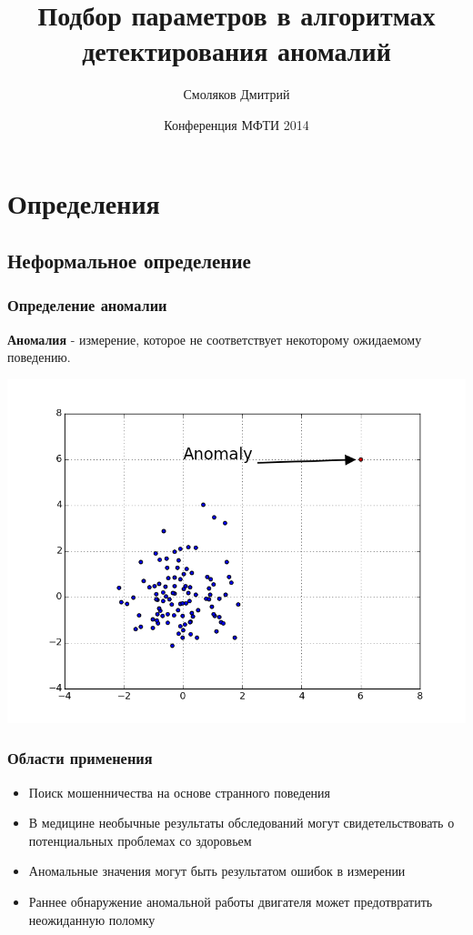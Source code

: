 \documentclass[10pt,pdf]{beamer}
\title{Подбор параметров в алгоритмах детектирования аномалий}
\author{Смоляков Дмитрий}
\institute{ИППИ РАН}
\date{Конференция МФТИ 2014}
\begin{document}
\maketitle
\section{Определения}
\subsection{Неформальное определение}
\begin{frame}\frametitle{Определение аномалии}
\textbf{Аномалия} - измерение, которое не соответствует некоторому ожидаемому поведению.
\begin{center}
\includegraphics[scale=0.45]{anomaly_example}
\end{center}
\end{frame}

\begin{frame}\frametitle{Области применения}
\begin{itemize}
\item Поиск мошенничества на основе странного поведения
\item В медицине необычные результаты обследований могут свидетельствовать о потенциальных проблемах со здоровьем
\item Аномальные значения могут быть результатом ошибок в измерении
\item Раннее обнаружение аномальной работы двигателя может предотвратить неожиданную поломку
\end{itemize}
\end{frame}
\end{document}
